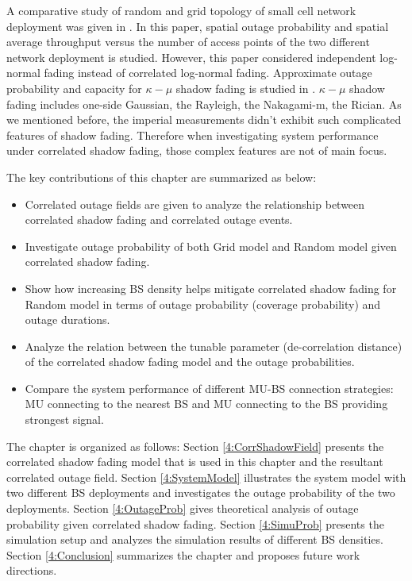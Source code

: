  \par A comparative study of random and grid topology of small cell network deployment was given in \cite{chen2012small}. In this paper, spatial outage probability and spatial average throughput versus the number of access points of the two different network deployment is studied. However, this paper considered independent log-normal fading instead of correlated log-normal fading. Approximate outage probability and capacity for $\kappa-\mu$ shadow fading is studied in \cite{kumar2015approximate}. $\kappa-\mu$ shadow fading includes one-side Gaussian, the Rayleigh, the Nakagami-m, the Rician. As we mentioned before, the imperial measurements didn't exhibit such complicated features of shadow fading. Therefore when investigating system performance under correlated shadow fading, those complex features are not of main focus.
 \par The key contributions of this chapter are summarized as below:
 \begin{itemize}
 \item Correlated outage fields are given to analyze the relationship between correlated shadow fading and correlated outage events. 
 \item Investigate outage probability of both Grid model and Random model given correlated shadow fading.
 \item Show how increasing BS density helps mitigate correlated shadow fading for Random model in terms of outage probability (coverage probability) and outage durations.
 \item Analyze the relation between the tunable parameter (de-correlation distance) of the correlated shadow fading model and the outage probabilities.
 \item Compare the system performance of different MU-BS connection strategies: MU connecting to the nearest BS and MU connecting to the BS providing strongest signal.
 \end{itemize}
 The chapter is organized as follows: Section \ref{4:CorrShadowField} presents the correlated shadow fading model that is used in this chapter and the resultant correlated outage field. Section \ref{4:SystemModel} illustrates the system model with two different BS deployments and investigates the outage probability of the two deployments. Section \ref{4:OutageProb} gives theoretical analysis of outage probability given correlated shadow fading. Section \ref{4:SimuProb} presents the simulation setup and analyzes the simulation results of different BS densities. Section \ref{4:Conclusion} summarizes the chapter and proposes future work directions.
